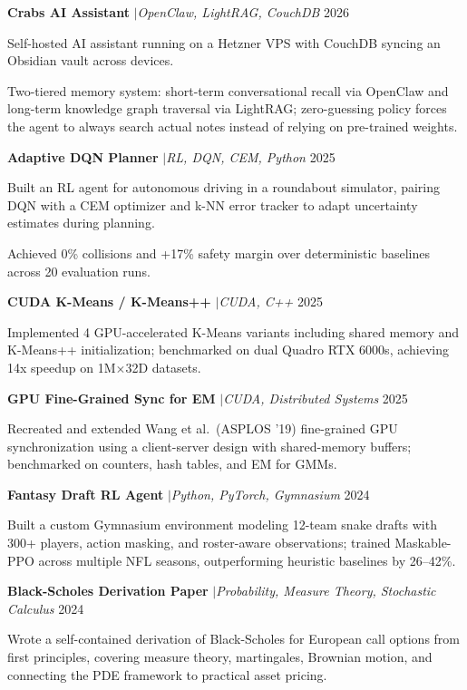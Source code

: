 \documentclass[letterpaper,10.5pt]{article}
\let\olditemize\itemize
\let\oldenditemize\enditemize
\renewenvironment{itemize}{%
  \olditemize
  \setlength{\itemsep}{1pt}%
  \setlength{\parskip}{0pt}%
  \setlength{\parsep}{0pt}%
  \setlength{\topsep}{1.5pt}%
  \setlength{\leftmargin}{1.2em}%
}{\oldenditemize}
\begin{document}
{\small
\textbf{Crabs AI Assistant} \enspace$\vert$\enspace \textit{OpenClaw, LightRAG, CouchDB} \hfill 2026
\begin{itemize}
  \item Self-hosted AI assistant running on a Hetzner VPS with CouchDB syncing an Obsidian vault across devices.
  \item Two-tiered memory system: short-term conversational recall via OpenClaw and long-term knowledge graph traversal via LightRAG; zero-guessing policy forces the agent to always search actual notes instead of relying on pre-trained weights.
\end{itemize}

\textbf{Adaptive DQN Planner} \enspace$\vert$\enspace \textit{RL, DQN, CEM, Python} \hfill 2025
\begin{itemize}
  \item Built an RL agent for autonomous driving in a roundabout simulator, pairing DQN with a CEM optimizer and k-NN error tracker to adapt uncertainty estimates during planning.
  \item Achieved 0\% collisions and +17\% safety margin over deterministic baselines across 20 evaluation runs.
\end{itemize}

\textbf{CUDA K-Means / K-Means++} \enspace$\vert$\enspace \textit{CUDA, C++} \hfill 2025
\begin{itemize}
  \item Implemented 4 GPU-accelerated K-Means variants including shared memory and K-Means++ initialization; benchmarked on dual Quadro RTX 6000s, achieving 14x speedup on 1M$\times$32D datasets.
\end{itemize}

\textbf{GPU Fine-Grained Sync for EM} \enspace$\vert$\enspace \textit{CUDA, Distributed Systems} \hfill 2025
\begin{itemize}
  \item Recreated and extended Wang et al.\ (ASPLOS '19) fine-grained GPU synchronization using a client-server design with shared-memory buffers; benchmarked on counters, hash tables, and EM for GMMs.
\end{itemize}

\textbf{Fantasy Draft RL Agent} \enspace$\vert$\enspace \textit{Python, PyTorch, Gymnasium} \hfill 2024
\begin{itemize}
  \item Built a custom Gymnasium environment modeling 12-team snake drafts with 300+ players, action masking, and roster-aware observations; trained Maskable-PPO across multiple NFL seasons, outperforming heuristic baselines by 26--42\%.
\end{itemize}

\textbf{Black-Scholes Derivation Paper} \enspace$\vert$\enspace \textit{Probability, Measure Theory, Stochastic Calculus} \hfill 2024
\begin{itemize}
  \item Wrote a self-contained derivation of Black-Scholes for European call options from first principles, covering measure theory, martingales, Brownian motion, and connecting the PDE framework to practical asset pricing.
\end{itemize}
}
\end{document}
